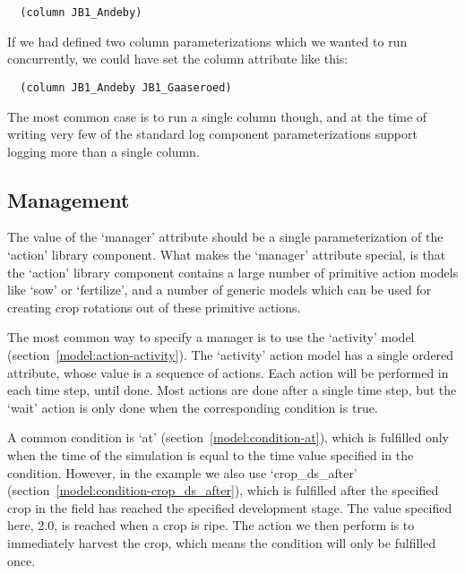 \begin{verbatim}
  (column JB1_Andeby)
\end{verbatim}

If we had defined two column parameterizations which we wanted to run
concurrently, we could have set the column attribute like this:

\begin{verbatim}
  (column JB1_Andeby JB1_Gaaseroed)
\end{verbatim}

The most common case is to run a single column though, and at the time
of writing very few of the standard log component parameterizations
support logging more than a single column.

\subsection{Management}
\label{sec:management}

The value of the `manager' attribute should be a single
parameterization of the `action' library component.  What makes the
`manager' attribute special, is that the `action' library component
contains a large number of primitive action models like `sow' or
`fertilize', and a number of generic models which can be used for
creating crop rotations out of these primitive actions.

The most common way to specify a manager is to use the `activity' model
(section~\ref{model:action-activity}).  The `activity' action model has a
single ordered attribute, whose value is a sequence of actions.  Each
action will be performed in each time step, until done.  Most actions
are done after a single time step, but the `wait' action is only done
when the corresponding condition is true.

A common condition is `at' (section~\ref{model:condition-at}), which
is fulfilled only when the time of the simulation is equal to the time
value specified in the condition.  However, in the example we also use
`crop\_ds\_after' (section~\ref{model:condition-crop_ds_after}), which
is fulfilled after the specified crop in the field has reached the
specified development stage.  The value specified here, 2.0, is
reached when a crop is ripe.  The action we then perform is to
immediately harvest the crop, which means the condition will only be
fulfilled once.

